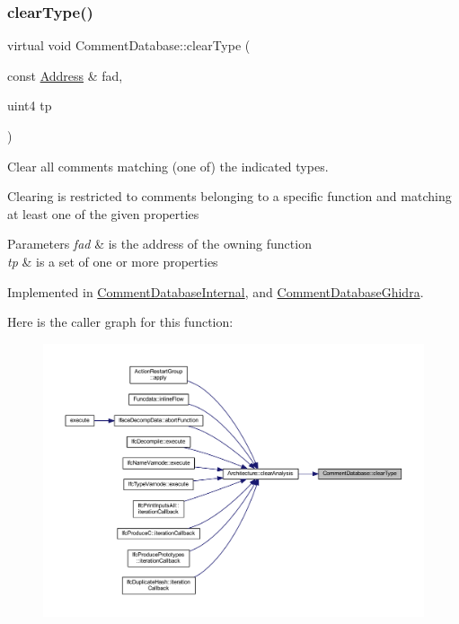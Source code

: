 \mbox{\label{class_comment_database_af4467b35ea8555ddc77e810453051a96}} 
\subsubsection{\texorpdfstring{clearType()}{clearType()}}
{\footnotesize\ttfamily virtual void Comment\+Database\+::clear\+Type (\begin{DoxyParamCaption}\item[{const \mbox{\hyperlink{class_address}{Address}} \&}]{fad,  }\item[{uint4}]{tp }\end{DoxyParamCaption})\hspace{0.3cm}{\ttfamily [pure virtual]}}



Clear all comments matching (one of) the indicated types. 

Clearing is restricted to comments belonging to a specific function and matching at least one of the given properties 
\begin{DoxyParams}{Parameters}
{\em fad} & is the address of the owning function \\
\hline
{\em tp} & is a set of one or more properties \\
\hline
\end{DoxyParams}


Implemented in \mbox{\hyperlink{class_comment_database_internal_a5ab44b5d53ca52aef756c9ad476e2b34}{Comment\+Database\+Internal}}, and \mbox{\hyperlink{class_comment_database_ghidra_ac5b963863187535cd0c2150bc7df4510}{Comment\+Database\+Ghidra}}.

Here is the caller graph for this function\+:
\nopagebreak
\begin{figure}[H]
\begin{center}
\leavevmode
\includegraphics[width=350pt]{class_comment_database_af4467b35ea8555ddc77e810453051a96_icgraph}
\end{center}
\end{figure}
\mbox{\label{class_comment_database_ac41202723e47b57dd4996d484629d019}} 
